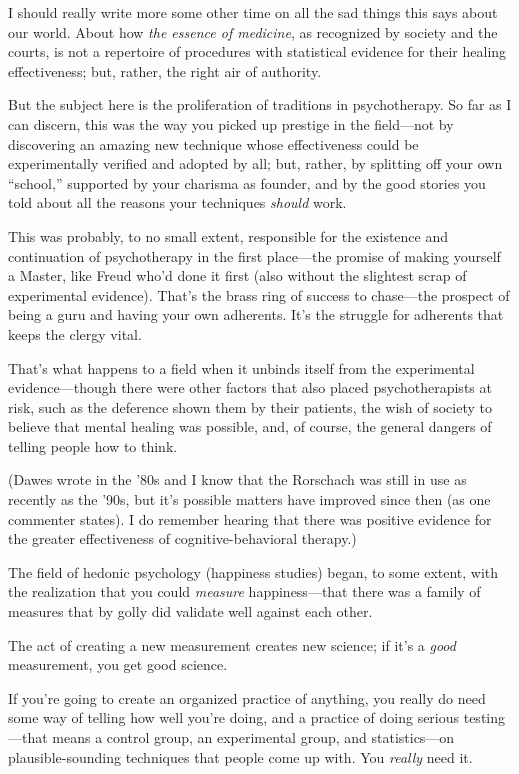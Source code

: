 {
 I should really write more some other time on all the sad things
this says about our world. About how \textit{the essence of medicine},
as recognized by society and the courts, is not a repertoire of
procedures with statistical evidence for their healing effectiveness;
but, rather, the right air of authority.}

{
 But the subject here is the proliferation of traditions in
psychotherapy. So far as I can discern, this was the way you picked up
prestige in the field---not by discovering an amazing new technique
whose effectiveness could be experimentally verified and adopted by
all; but, rather, by splitting off your own
``school,'' supported by your
charisma as founder, and by the good stories you told about all the
reasons your techniques \textit{should} work.}

{
 This was probably, to no small extent, responsible for the
existence and continuation of psychotherapy in the first place---the
promise of making yourself a Master, like Freud who'd
done it first (also without the slightest scrap of experimental
evidence). That's the brass ring of success to
chase---the prospect of being a guru and having your own adherents.
It's the struggle for adherents that keeps the clergy
vital.}

{
 That's what happens to a field when it unbinds
itself from the experimental evidence---though there were other factors
that also placed psychotherapists at risk, such as the deference shown
them by their patients, the wish of society to believe that mental
healing was possible, and, of course, the general dangers of telling
people how to think.}

{
 (Dawes wrote in the '80s and I know that the
Rorschach was still in use as recently as the '90s, but
it's possible matters have improved since then (as one
commenter states). I do remember hearing that there was positive
evidence for the greater effectiveness of cognitive-behavioral
therapy.)}

{
 The field of hedonic psychology (happiness studies) began, to some
extent, with the realization that you could \textit{measure}
happiness---that there was a family of measures that by golly did
validate well against each other.}

{
 The act of creating a new measurement creates new science; if
it's a \textit{good} measurement, you get good
science.}

{
 If you're going to create an organized practice of
anything, you really do need some way of telling how well
you're doing, and a practice of doing serious
testing---that means a control group, an experimental group, and
statistics---on plausible-sounding techniques that people come up with.
You \textit{really} need it.}

